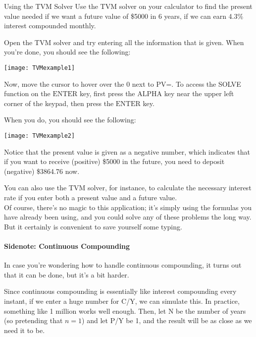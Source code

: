 \begin{example}{Using the TVM Solver}
Use the TVM solver on your calculator to find the present value needed if we want a future value of \$5000 in 6 years, if we can earn 4.3\% interest compounded monthly.

\sol
Open the TVM solver and try entering all the information that is given.  When you're done, you should see the following:
\begin{center}
\texttt{[image: TVMexample1]}
\end{center}

Now, move the cursor to hover over the 0 next to PV=.  To access the SOLVE function on the $\boxed{\textrm{ENTER}}$ key, first press the $\boxed{\textrm{ALPHA}}$ key near the upper left corner of the keypad, then press the $\boxed{\textrm{ENTER}}$ key.

When you do, you should see the following:
\begin{center}
\texttt{[image: TVMexample2]}
\end{center}

Notice that the present value is given as a negative number, which indicates that if you want to receive (positive) \$5000 in the future, you need to deposit (negative) \$3864.76 now.
\end{example}

You can also use the TVM solver, for instance, to calculate the necessary interest rate if you enter both a present value and a future value.\\

Of course, there's no magic to this application; it's simply using the formulas you have already been using, and you could solve any of these problems the long way.  But it certainly is convenient to save yourself some typing.

\paragraph{Sidenote: Continuous Compounding} In case you're wondering how to handle continuous compounding, it turns out that it can be done, but it's a bit harder.

Since continuous compounding is essentially like interest compounding every instant, if we enter a huge number for C/Y, we can simulate this.  In practice, something like 1 million works well enough.  Then, let N be the number of years (so pretending that $n=1$) and let P/Y be 1, and the result will be as close as we need it to be.
\vfill
\pagebreak

